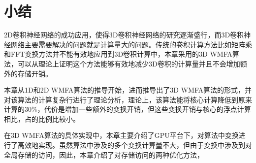 \section{小结}
2D卷积神经网络的成功应用，使得3D卷积神经网络的研究逐渐盛行，而3D卷积神经网络主要需要解决的问题就是计算量大的问题。传统的卷积计算方法比如矩阵乘和FFT变换方法并不能有效地应用到3D卷积计算中，本章采用的3D WMFA算法，可以从理论上证明这个方法能够有效地减少3D卷积的计算量并且不会增加额外的存储开销。

本章从1D和2D WMFA算法的推导开始，进而推导出了3D WMFA算法的形式，并对该算法的计算复杂行进行了理论分析，理论上，该算法能将核心计算降低到原来计算的$30$\%，代价是增加一些额外的变换开销，但这些变换开销与核心的浮点计算相比，占的比例比较小。

在3D WMFA算法的具体实现中，本章主要介绍了GPU平台下，对算法中变换进行了高效地实现。虽然算法中涉及的多个变换计算量不大，但由于变换中涉及到对全局存储的访问，因此，本章介绍了对存储访问的两种优化方法，

























